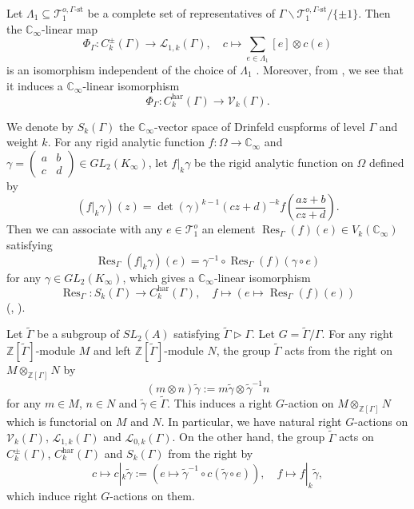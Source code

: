 \documentclass[11pt]{amsart}
\theoremstyle{plain}
\theoremstyle{definition}
\newcommand{\har}{\mathrm{har}}
\DeclareMathOperator{\Res}{Res}
\newcommand{\st}{\mathrm{st}}
\newcommand{\cL}{\mathcal{L}}
\newcommand{\cT}{\mathcal{T}}
\newcommand{\cV}{\mathcal{V}}
\newcommand{\bZ}{\mathbb{Z}}
\newcommand{\Kinf}{K_\infty}
\newcommand{\Cinf}{\mathbb{C}_{\infty}}
\begin{document}
Let $\Lambda_1\subseteq \cT_1^{o,\Gamma\text{-}\st}$ be a complete set of representatives of $\Gamma\backslash \cT_1^{o,\Gamma\text{-}\st}/\{\pm 1\}$.
Then the $\Cinf$-linear map
\[
\Phi_\Gamma: C_k^\pm(\Gamma)\to \cL_{1,k}(\Gamma),\quad c\mapsto \sum_{e\in \Lambda_1}[e]\otimes c(e)
\]
is an isomorphism independent of the choice of $\Lambda_1$ \cite[p.~9]{Ha_DMBF}. Moreover,
from \cite[p.~506]{Tei}, we see that it induces a $\Cinf$-linear isomorphism
\begin{equation*}%
\Phi_\Gamma: C_k^\har(\Gamma)\to \cV_k(\Gamma).
\end{equation*}



We denote by $S_k(\Gamma)$ the $\Cinf$-vector space of Drinfeld cuspforms of level $\Gamma$ and weight $k$. 
For any rigid analytic function $f:\Omega\to \Cinf$
and $\gamma=\begin{pmatrix}
	a&b\\c&d
\end{pmatrix}\in \mathit{GL}_2(\Kinf)$, let $f|_k\gamma$ be the rigid analytic function on $\Omega$ defined by
\[
(f|_k\gamma)(z)=\det(\gamma)^{k-1}(cz+d)^{-k}f\left(\frac{az+b}{cz+d}\right).
\]
Then we can associate with any $e\in \cT_1^o$ an element $\Res_{\Gamma}(f)(e)\in V_k(\Cinf)$ satisfying
\begin{equation}\label{EqnResSlash}
	\Res_\Gamma(f|_k\gamma)(e)=\gamma^{-1}\circ \Res_\Gamma(f)(\gamma\circ e)
\end{equation}
for any $\gamma\in\mathit{GL}_2(\Kinf)$, which gives a $\Cinf$-linear isomorphism
\begin{equation*}%
	\Res_\Gamma: S_k(\Gamma)\to C_k^\har(\Gamma),\quad f\mapsto (e\mapsto \Res_\Gamma(f)(e))
\end{equation*}
(\cite[Theorem 16]{Tei}, \cite[Theorem 5.10]{Boeckle}).



Let $\tilde{\Gamma}$ be a subgroup of $\mathit{SL}_2(A)$ satisfying $\tilde{\Gamma}\rhd \Gamma$. Let $G=\tilde{\Gamma}/\Gamma$.
For any right $\bZ[\tilde{\Gamma}]$-module $M$ and left $\bZ[\tilde{\Gamma}]$-module $N$, the group $\tilde{\Gamma}$ acts from the right on $M\otimes_{\bZ[\Gamma]}
N$ by
\[
(m\otimes n){\tilde{\gamma}}:=m{\tilde{\gamma}}\otimes \tilde{\gamma}^{-1}n
\]
for any $m\in M$, $n\in N$ and $\tilde{\gamma}\in \tilde{\Gamma}$. This induces a right $G$-action on $M\otimes_{\bZ[\Gamma]}
N$ which is functorial on $M$ and $N$. In particular, we have natural right $G$-actions on $\cV_k(\Gamma)$, $\cL_{1,k}(\Gamma)$ and $\cL_{0,k}(\Gamma)$.
On the other hand, the group $\tilde{\Gamma}$ acts on $C_k^\pm(\Gamma)$, $C_k^\har(\Gamma)$ and $S_k(\Gamma)$ from the right by
\[
c\mapsto c|_k\tilde{\gamma}:=(e\mapsto \tilde{\gamma}^{-1}\circ c(\tilde{\gamma}\circ e)),\quad f\mapsto f|_k\tilde{\gamma},
\]
which induce right $G$-actions on them.
\end{document}
